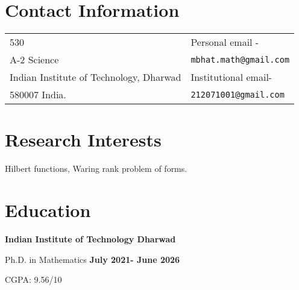 \documentclass[margin,line,pifont,palatino,courier]{res}
\begin{document}

\begin{resume}

\section{\sc Contact Information}

\vspace{.05in}
\begin{tabular}{@{}p{2.75in}p{2in}}
530                           &  Personal email - \\
A-2 Science            & \verb+mbhat.math@gmail.com+  \\ 
Indian Institute of Technology, Dharwad    &  Institutional email- \\
580007 India.                    & \verb+212071001@gmail.com+ \\ 
    
\end{tabular}


\section{\sc Research Interests}
Hilbert functions, Waring rank problem of forms.

\section{\sc Education}

{\bf Indian Institute of Technology Dharwad}
\vspace*{-.1in}

\hspace{0.2cm} Ph.D. in Mathematics  \hfill \textbf{ July 2021- June 2026} 
\vspace{-.35cm}

\hspace{0.4cm} CGPA: 9.56/10


\begin{itemize}


\end{itemize}
\end{resume}
\end{document}

